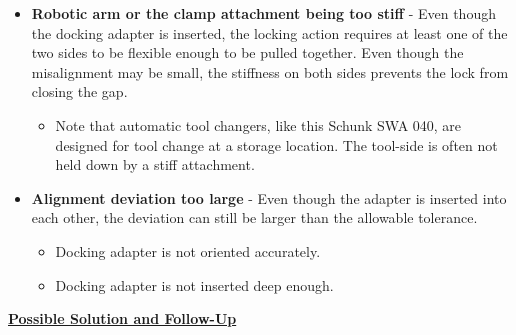 \begin{itemize}
	\item \textbf{Robotic arm or the clamp attachment being too stiff} - Even though the docking adapter is inserted, the locking action requires at least one of the two sides to be flexible enough to be pulled together. Even though the misalignment may be small, the stiffness on both sides prevents the lock from closing the gap.

\begin{itemize}
	\item Note that automatic tool changers, like this Schunk SWA 040, are designed for tool change at a storage location. The tool-side is often not held down by a stiff attachment.

\end{itemize}
	\item \textbf{Alignment deviation too large }- Even though the adapter is inserted into each other, the deviation can still be larger than the allowable tolerance.

\begin{itemize}
	\item Docking adapter is not oriented accurately.

	\item Docking adapter is not inserted deep enough.

\end{itemize}
\end{itemize}
\textbf{\uline{Possible Solution and Follow-Up}}

